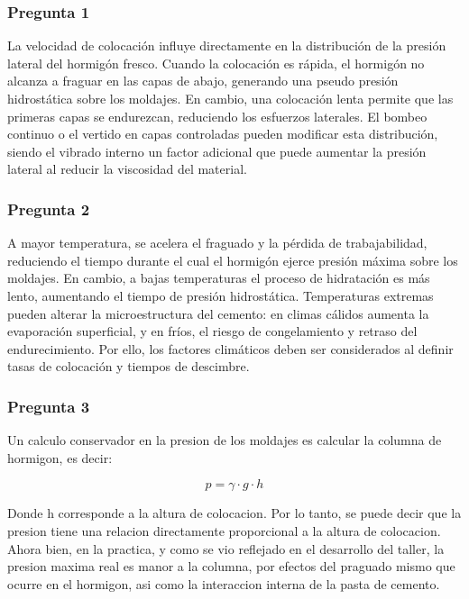 \subsubsection*{Pregunta 1} 
La velocidad de colocación influye directamente en la distribución de la presión lateral del hormigón fresco. Cuando la colocación es rápida, el hormigón no alcanza a fraguar en las capas de abajo, generando una pseudo presión hidrostática sobre los moldajes. En cambio, una colocación lenta permite que las primeras capas se endurezcan, reduciendo los esfuerzos laterales. El bombeo continuo o el vertido en capas controladas pueden modificar esta distribución, siendo el vibrado interno un factor adicional que puede aumentar la presión lateral al reducir la viscosidad del material.

\subsubsection*{Pregunta 2} 
A mayor temperatura, se acelera el fraguado y la pérdida de trabajabilidad, reduciendo el tiempo durante el cual el hormigón ejerce presión máxima sobre los moldajes. En cambio, a bajas temperaturas el proceso de hidratación es más lento, aumentando el tiempo de presión hidrostática. Temperaturas extremas pueden alterar la microestructura del cemento: en climas cálidos aumenta la evaporación superficial, y en fríos, el riesgo de congelamiento y retraso del endurecimiento. Por ello, los factores climáticos deben ser considerados al definir tasas de colocación y tiempos de descimbre.

\subsubsection*{Pregunta 3} 

Un calculo conservador en la presion de los moldajes es calcular la columna de hormigon, es decir:

\begin{equation}
    p = \gamma \cdot g \cdot h
\end{equation}

Donde h corresponde a la altura de colocacion. Por lo tanto, se puede decir que la presion tiene una relacion directamente proporcional a la altura de colocacion. Ahora bien, en la practica, y como se vio reflejado en el desarrollo del taller, la presion maxima real es manor a la columna, por efectos del praguado mismo que ocurre en el hormigon, asi como la interaccion interna de la pasta de cemento.


